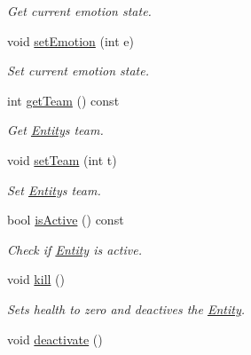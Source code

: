\begin{DoxyCompactItemize}
\begin{DoxyCompactList}\small\item\em Get current emotion state. \end{DoxyCompactList}\item 
void \hyperlink{classEntity_a79056ef5d580c09fe6cf34b989b14589}{set\+Emotion} (int e)\hypertarget{classEntity_a79056ef5d580c09fe6cf34b989b14589}{}\label{classEntity_a79056ef5d580c09fe6cf34b989b14589}

\begin{DoxyCompactList}\small\item\em Set current emotion state. \end{DoxyCompactList}\item 
int \hyperlink{classEntity_a413d08d1c89b90286c39ec0476613abf}{get\+Team} () const \hypertarget{classEntity_a413d08d1c89b90286c39ec0476613abf}{}\label{classEntity_a413d08d1c89b90286c39ec0476613abf}

\begin{DoxyCompactList}\small\item\em Get \hyperlink{classEntity}{Entity}\textquotesingle{}s team. \end{DoxyCompactList}\item 
void \hyperlink{classEntity_a9fe88f82909f89087ad17d4d7ce6b22e}{set\+Team} (int t)\hypertarget{classEntity_a9fe88f82909f89087ad17d4d7ce6b22e}{}\label{classEntity_a9fe88f82909f89087ad17d4d7ce6b22e}

\begin{DoxyCompactList}\small\item\em Set \hyperlink{classEntity}{Entity}\textquotesingle{}s team. \end{DoxyCompactList}\item 
bool \hyperlink{classEntity_a6b9926025e54639201b59b447da5365b}{is\+Active} () const \hypertarget{classEntity_a6b9926025e54639201b59b447da5365b}{}\label{classEntity_a6b9926025e54639201b59b447da5365b}

\begin{DoxyCompactList}\small\item\em Check if \hyperlink{classEntity}{Entity} is active. \end{DoxyCompactList}\item 
void \hyperlink{classEntity_a522648b330daab91b49f78f0737a943f}{kill} ()\hypertarget{classEntity_a522648b330daab91b49f78f0737a943f}{}\label{classEntity_a522648b330daab91b49f78f0737a943f}

\begin{DoxyCompactList}\small\item\em Sets health to zero and deactives the \hyperlink{classEntity}{Entity}. \end{DoxyCompactList}\item 
void \hyperlink{classEntity_aa409e70e0f5abb2ac1314f8745b9a661}{deactivate} ()\hypertarget{classEntity_aa409e70e0f5abb2ac1314f8745b9a661}{}\label{classEntity_aa409e70e0f5abb2ac1314f8745b9a661}


\end{DoxyCompactItemize}
